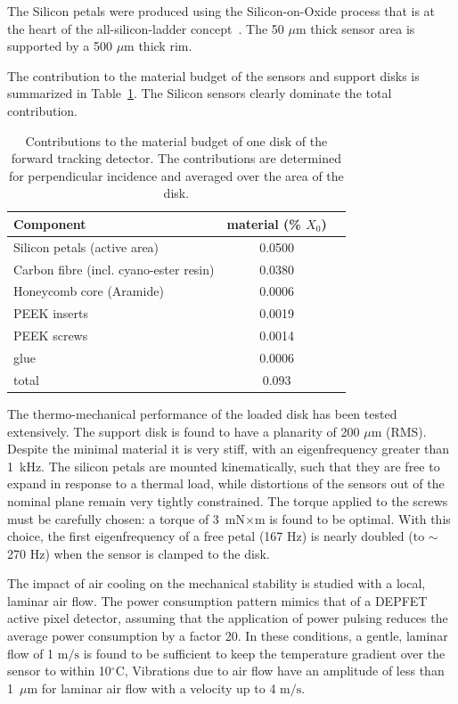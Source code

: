 The Silicon petals were produced using the Silicon-on-Oxide process that is at the heart of the
all-silicon-ladder concept~\cite{Andricek:2004cj}. The 50 $\mu \mathrm{m}$ thick sensor area is supported by a 500 $\mu \mathrm{m}$ thick rim.

The contribution to the material budget of the sensors and support disks is 
summarized in Table~\ref{tab:ftd_disk_material_budget}. The Silicon sensors clearly
dominate the total contribution.

\begin{table}[]
    \centering
    \begin{tabular}{lcc}
    \toprule
    Component                      & material (\% $X_0$) \\ \midrule
    Silicon petals (active area)  &         0.0500 \\
    Carbon fibre (incl. cyano-ester resin)     &   0.0380 \\
    Honeycomb core (Aramide)      &   0.0006 \\
    PEEK inserts                  &   0.0019 \\
    PEEK screws                   &   0.0014 \\
    glue                          &   0.0006  \\ \midrule
    total                         &     0.093      \\ \bottomrule
    \end{tabular}
    \caption{Contributions to the material budget of one disk of the forward tracking detector. The contributions are determined for perpendicular incidence and averaged over the area
    of the disk.}
    \label{tab:ftd_disk_material_budget}
\end{table}

The thermo-mechanical performance of the loaded disk has been tested extensively. The 
support disk is found to have a planarity of 200 $\mu \mathrm{m}$ (RMS). Despite the 
minimal material it is very stiff, with an eigenfrequency greater than 1~kHz. The
silicon petals are mounted kinematically, such that they are free to expand in response
to a thermal load, while distortions of the sensors out of the nominal plane remain
very tightly constrained. The torque applied to the screws must be carefully
chosen: a torque of 3~mN$\times$m is found to be optimal. 
With this choice, the first eigenfrequency of a free petal (167 Hz) is nearly
doubled (to $\sim$ 270 Hz) when the sensor is clamped to the disk. 

The impact of air cooling on the mechanical stability is studied with a local, 
laminar air flow. The power consumption pattern mimics that of a DEPFET
active pixel detector, assuming that the application of power pulsing reduces
the average power consumption by a factor 20.
In these conditions, a gentle, laminar flow of 1 $\mathrm{m/s}$ is found to be sufficient
to keep the temperature gradient over the sensor to within 10$^{\circ}$C, 
Vibrations due to air flow have an  amplitude of less than 1~$\mu \mathrm{m}$ 
for laminar air flow with a velocity up to 4 $\mathrm{m/s}$. 

